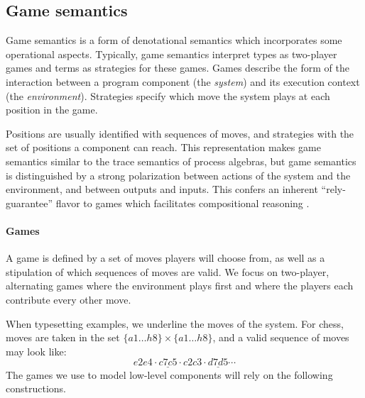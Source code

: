 \documentclass[sigplan,10pt,review]{acmart}
\begin{document}
\subsection{Game semantics} \label{sec:gamesem} %


Game semantics is a form of denotational semantics which
incorporates some operational aspects.
Typically,
game semantics interpret
types as two-player games
and terms as strategies for these games.
Games describe the form of the interaction
between a program component %
(the \emph{system})
and its execution context
(the \emph{environment}).
Strategies
specify which move the system plays
at each position in the game.

Positions are usually identified with sequences of moves,
and strategies with the set of positions
a component can reach.
This representation makes
game semantics similar to
the trace semantics of process algebras,
but game semantics is distinguished
by a strong polarization between
actions of the system and the environment,
and between outputs and inputs.
This confers an inherent ``rely-guarantee'' flavor
to games which facilitates compositional reasoning
\cite{cspgs}.


\paragraph{Games} \label{sec:mainideas:gs:games} %

A game is defined by a set of moves
players will choose from,
as well as a stipulation of which
sequences of moves are valid.
We focus on two-player, alternating games
where the environment plays first and
where the players
each contribute every other move.

When typesetting examples,
we underline the moves of the system.
For chess,
moves are taken in the set $\{a1 \ldots h8\} \times \{a1 \ldots h8\}$,
and a valid sequence of moves may look like:
\[ e2e4 \cdot \underline{c7c5} \cdot c2c3 \cdot \underline{d7d5} \cdots \]
The games we use to model low-level components
will rely on the following constructions.
\end{document}
